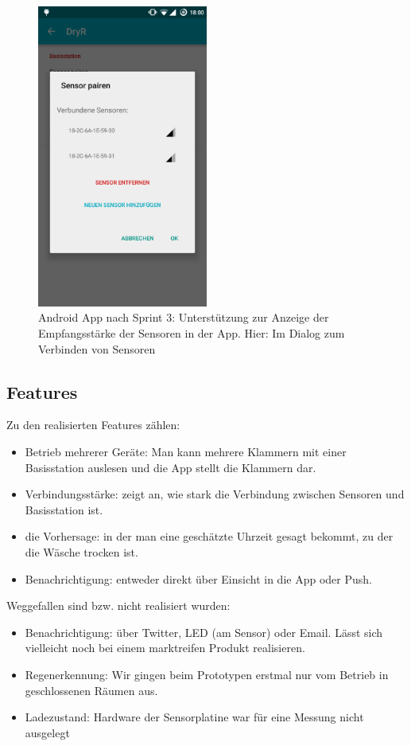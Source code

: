 \begin{figure}[htb] 
	\centerline{\includegraphics[width=0.5\textwidth]{pair_sensor_dialog_reception.png}}
	\caption{Android App nach Sprint 3: Unterstützung zur Anzeige der Empfangsstärke der Sensoren in der App. Hier: Im Dialog zum Verbinden von Sensoren}
	\label{screenshot_sprint_3_pair_sensor}
\end{figure}
\clearpage
\subsection{Features}
Zu den realisierten Features zählen:
\begin{itemize}
	\item Betrieb mehrerer Geräte: Man kann mehrere Klammern mit einer Basisstation auslesen und die App stellt die Klammern dar.
	\item Verbindungsstärke: zeigt an, wie stark die Verbindung zwischen Sensoren und Basisstation ist.
	\item die Vorhersage: in der man eine geschätzte Uhrzeit gesagt bekommt, zu der die Wäsche trocken ist.
	\item Benachrichtigung: entweder direkt über Einsicht in die App oder Push.
\end{itemize}
Weggefallen sind bzw. nicht realisiert wurden:
\begin{itemize}
	\item Benachrichtigung: über Twitter, LED (am Sensor) oder Email. Lässt sich vielleicht noch bei einem marktreifen Produkt realisieren. 
	\item Regenerkennung: Wir gingen beim Prototypen erstmal nur vom Betrieb in geschlossenen Räumen aus. 
	\item Ladezustand: Hardware der Sensorplatine war für eine Messung nicht ausgelegt
\end{itemize}